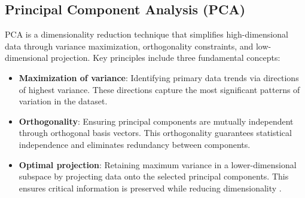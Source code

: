 \documentclass{article}
\begin{document}
	\subsection{Principal Component Analysis (PCA)}
	PCA is a dimensionality reduction technique that simplifies high-dimensional data through variance maximization, orthogonality constraints, and low-dimensional projection. Key principles include three fundamental concepts:
	
	\begin{itemize}
		\item \textbf{Maximization of variance}: Identifying primary data trends via directions of highest variance. These directions capture the most significant patterns of variation in the dataset.
		\item \textbf{Orthogonality}: Ensuring principal components are mutually independent through orthogonal basis vectors. This orthogonality guarantees statistical independence and eliminates redundancy between components.
		\item \textbf{Optimal projection}: Retaining maximum variance in a lower-dimensional subspace by projecting data onto the selected principal components. This ensures critical information is preserved while reducing dimensionality \cite{Jolliffe2002}.
	\end{itemize}
	
\end{document}
